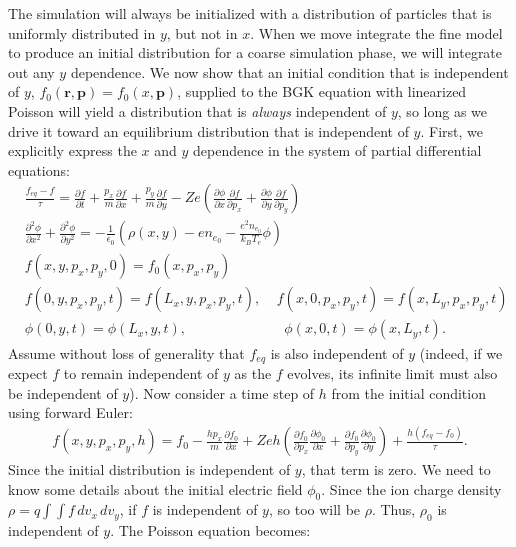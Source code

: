 \documentclass{article}
\begin{document}
The simulation will always be initialized with a distribution of particles that is uniformly distributed in $y$, but not in $x$. When we move integrate the fine model to produce an initial distribution for a coarse simulation phase, we will integrate out any $y$ dependence. We now show that an initial condition that is independent of $y$, $f_0(\mathbf{r},\mathbf{p})=f_0(x,\mathbf{p})$, supplied to the BGK equation with linearized Poisson will yield a distribution that is \emph{always} independent of $y$, so long as we drive it toward an equilibrium distribution that is independent of $y$. First, we explicitly express the $x$ and $y$ dependence in the system of partial differential equations:
\begin{equation*}
\begin{split}
&\frac{f_{eq}-f}{\tau}=\frac{\partial f}{\partial t}+\frac{p_x}{m}\frac{\partial f}{\partial x}+\frac{p_y}{m}\frac{\partial f}{\partial y}-Ze\left(\frac{\partial\phi}{\partial x}\frac{\partial f}{\partial p_x}+\frac{\partial\phi}{\partial y}\frac{\partial f}{\partial p_y}\right)\\
&\frac{\partial^2 \phi}{\partial x^2}+\frac{\partial^2\phi}{\partial y^2}=-\frac{1}{\epsilon_0}\left(\rho(x,y)-en_{e_0}-\frac{e^2n_{e_0}}{k_BT_e}\phi\right)\\
&f(x,y,p_x,p_y,0)=f_0(x,p_x,p_y)\\
&f(0,y,p_x,p_y,t)=f(L_x,y,p_x,p_y,t),\;\;\;\;
f(x,0,p_x,p_y,t)=f(x,L_y,p_x,p_y,t)\\
&\phi(0,y,t)=\phi(L_x,y,t),\;\;\;\;\;\;\;\;\;\;\;\;\;\;\;\;\;\;\;\;\;\;\;\;\;
\phi(x,0,t)=\phi(x,L_y,t).
\end{split}
\end{equation*}Assume without loss of generality that $f_{eq}$ is also independent of $y$ (indeed, if we expect $f$ to remain independent of $y$ as the $f$ evolves, its infinite limit must also be independent of $y$). Now consider a time step of $h$ from the initial condition using forward Euler:
\begin{eqnarray*}f(x,y,p_x,p_y,h)=f_0-\frac{hp_x}{m}\frac{\partial f_0}{\partial x}+Zeh\left(\frac{\partial f_0}{\partial p_x}\frac{\partial \phi_0}{\partial x}+\frac{\partial f_0}{\partial p_y}\frac{\partial \phi_0}{\partial y}\right)+\frac{h(f_{eq}-f_0)}{\tau}.
\end{eqnarray*}
Since the initial distribution is independent of $y$, that term is zero. We need to know some details about the initial electric field $\phi_0$. Since the ion charge density $\rho=q\int\int f\,dv_x\,dv_y$, if $f$ is independent of $y$, so too will be $\rho$. Thus, $\rho_0$ is independent of $y$. The Poisson equation becomes:
\end{document}
